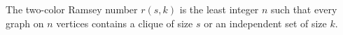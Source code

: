 \begin{definition}
The two-color Ramsey number \(r(s,k)\) is the least integer \(n\) such that every graph on \(n\) vertices contains a clique of size \(s\) or an independent set of size \(k\).
\end{definition}
